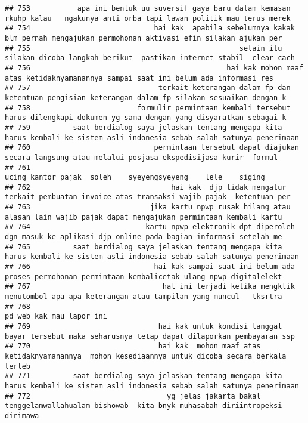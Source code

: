 \documentclass[
]{article}
\begin{document}
\begin{verbatim}
## 753           apa ini bentuk uu suversif gaya baru dalam kemasan rkuhp kalau   ngakunya anti orba tapi lawan politik mau terus merek
## 754                             hai kak  apabila sebelumnya kakak blm pernah mengajukan permohonan aktivasi efin silakan ajukan per 
## 755                                                 selain itu silakan dicoba langkah berikut  pastikan internet stabil  clear cach 
## 756                                              hai kak mohon maaf atas ketidaknyamanannya sampai saat ini belum ada informasi res 
## 757                              terkait keterangan dalam fp dan ketentuan pengisian keterangan dalam fp silakan sesuaikan dengan k 
## 758                         formulir permintaan kembali tersebut harus dilengkapi dokumen yg sama dengan yang disyaratkan sebagai k 
## 759          saat berdialog saya jelaskan tentang mengapa kita harus kembali ke sistem asli indonesia sebab salah satunya penerimaan
## 760                             permintaan tersebut dapat diajukan secara langsung atau melalui posjasa ekspedisijasa kurir  formul 
## 761                                                                  ucing kantor pajak  soleh    syeyengsyeyeng    lele    siging  
## 762                                 hai kak  djp tidak mengatur terkait pembuatan invoice atas transaksi wajib pajak  ketentuan per 
## 763                            jika kartu npwp rusak hilang atau alasan lain wajib pajak dapat mengajukan permintaan kembali kartu  
## 764                           kartu npwp elektronik dpt diperoleh dgn masuk ke aplikasi djp online pada bagian informasi setelah me 
## 765          saat berdialog saya jelaskan tentang mengapa kita harus kembali ke sistem asli indonesia sebab salah satunya penerimaan
## 766                             hai kak sampai saat ini belum ada proses permohonan permintaan kembalicetak ulang npwp digitalelekt 
## 767                               hal ini terjadi ketika mengklik menutombol apa apa keterangan atau tampilan yang muncul   tksrtra 
## 768                                                                                                         pd web kak mau lapor ini
## 769                              hai kak untuk kondisi tanggal bayar tersebut maka seharusnya tetap dapat dilaporkan pembayaran ssp 
## 770                              hai kak  mohon maaf atas ketidaknyamanannya  mohon kesediaannya untuk dicoba secara berkala terleb 
## 771          saat berdialog saya jelaskan tentang mengapa kita harus kembali ke sistem asli indonesia sebab salah satunya penerimaan
## 772                                yg jelas jakarta bakal tenggelamwallahualam bishowab  kita bnyk muhasabah diriintropeksi dirimawa

\end{verbatim}
\end{document}
